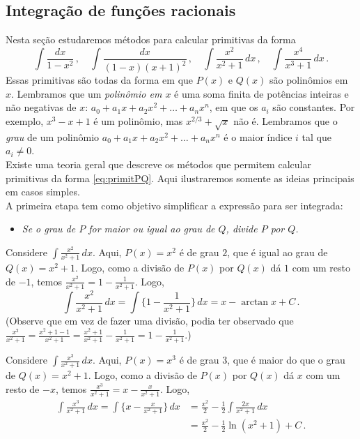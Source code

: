 \subsection{Integração de funções racionais}\label{Sec:FracParciais}
Nesta seção estudaremos métodos para calcular primitivas da forma 
$$
\int \frac{dx}{1-x^2}\,,\quad \int \frac{dx}{(1-x)(x+1)^2}\,,
\quad \int\frac{x^2}{x^2+1}\,dx\,,\quad
\int\frac{x^4}{x^3+1}\,dx\,.
$$
Essas primitivas são todas da forma
em que $P(x)$ e $Q(x)$ são polinômios em $x$. Lembramos que um \emph{polinômio em $x$} 
é uma soma finita de potências inteiras e não negativas de $x$: $a_0+a_1x+a_2x^2+\dots+ a_nx^n$, em que
os $a_i$ são constantes. Por exemplo, $x^3-x+1$ é um polinômio, mas
$x^{2/3}+\sqrt{x}$ não é. Lembramos que o \emph{grau} de um polinômio $a_0+a_1x+a_2x^2+\dots+ a_nx^n$ é
o maior índice $i$ tal que $a_i\neq 0$.\\

Existe uma teoria geral que descreve os
métodos que permitem calcular primitivas da forma \eqref{eq:primitPQ}. 
Aqui ilustraremos somente as
ideias principais em casos simples.\\

A primeira etapa tem como objetivo simplificar a expressão para ser
integrada:
\begin{itemize}
 \item \emph{Se o grau de $P$ for maior ou igual ao grau de $Q$, divide
$P$ por $Q$.}
\end{itemize}


\begin{ex}
Considere $\int \frac{x^2}{x^2+1}\,dx$. Aqui, $P(x)=x^2$ é de grau
$2$, que é igual ao grau de $Q(x)=x^2+1$. Logo, como a divisão de $P(x)$ por
$Q(x)$ dá $1$ com um resto de $-1$, temos
$\frac{x^2}{x^2+1}=1-\frac{1}{x^2+1}$. Logo,
$$
\int \frac{x^2}{x^2+1}\,dx=\int\Big\{
1-\frac{1}{x^2+1}\Big\}\,dx=
x-\arctan x+C\,.
$$
(Observe que em vez de fazer uma divisão, podia ter observado que 
$\frac{x^2}{x^2+1}=\frac{x^2+1-1}{x^2+1}=\frac{x^2+1}{x^2+1}-\frac{1}{x^2+1}
=1-\frac{1}{x^2+1}$.)
\end{ex}

\begin{ex}
Considere $\int \frac{x^3}{x^2+1}\,dx$. Aqui, $P(x)=x^3$ é de grau
$3$, que é maior do que o grau de $Q(x)=x^2+1$. Logo, como a divisão de $P(x)$
por
$Q(x)$ dá $x$ com um resto de $-x$, temos
$\frac{x^3}{x^2+1}=x-\frac{x}{x^2+1}$. Logo,
\begin{align*}
\int \frac{x^3}{x^2+1}\,dx=\int\Big\{
x-\frac{x}{x^2+1}\Big\}\,dx&=
\tfrac{x^2}{2}-\tfrac12\int\frac{2x}{x^2+1}\,dx\\
&=\tfrac{x^2}{2}- \tfrac{1}{2}\ln (x^2+1)+C\,.
\end{align*}
\end{ex}

